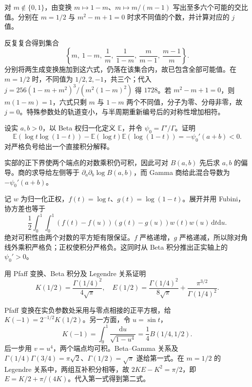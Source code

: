 \begin{exercise}\label{b3:ex:F-5}
对 \(m\notin\{0,1\}\)，由变换 \(m\mapsto1-m\)、\(m\mapsto m/(m-1)\) 写出至多六个可能的交比值。分别在 \(m=1/2\) 与 \(m^2-m+1=0\) 时求不同值的个数，并计算对应的 \(j\) 值。
\end{exercise}
\begin{solution}
反复复合得到集合
\[
 \left\{m,\ 1-m,\ \frac1m,\ \frac1{1-m},\
 \frac m{m-1},\ \frac{m-1}m\right\}.
\]
分别将两生成变换施加到这六式，仍落在该集合内，故已包含全部可能值。在 \(m=1/2\) 时，不同值为 \(1/2,2,-1\)，共三个；代入
\(j=256(1-m+m^2)^3/(m^2(1-m)^2)\) 得 \(1728\)。若 \(m^2-m+1=0\)，则 \(m(1-m)=1\)，六式只剩 \(m\) 与 \(1-m\) 两个不同值，分子为零、分母非零，故 \(j=0\)。特殊参数处的轨道变小，与半周期重新编号后的对称性增加相符。
\end{solution}

\begin{exercise}\label{b3:ex:F-6}
设实 \(a,b>0\)，以 Beta 权归一化定义 \(\mathbb E\)，并令 \(\psi_0=\Gamma'/\Gamma\)。证明
\[
 \mathbb E(\log t\log(1-t))
 -\mathbb E(\log t)\mathbb E(\log(1-t))=-\psi_0'(a+b)<0.
\]
对严格负号给出一个直接积分解释。
\end{exercise}
\begin{solution}
实部的正下界使两个端点的对数乘积仍可积，因此可对 \(B(a,b)\) 先后求 \(a,b\) 的偏导。商的求导给左侧等于 \(\partial_a\partial_b\log B(a,b)\)，而 Gamma 商给此混合导数为 \(-\psi_0'(a+b)\)。

记 \(w\) 为归一化正权，\(f(t)=\log t\)、\(g(t)=\log(1-t)\)。展开并用 Fubini，协方差也等于
\[
 \frac12\int_0^1\int_0^1
 (f(t)-f(u))(g(t)-g(u))w(t)w(u)\,\mathrm{d}t\mathrm{d}u.
\]
绝对可积性由两个对数的平方矩有限保证。\(f\) 严格递增，\(g\) 严格递减，所以除对角线外乘积严格负；正权使积分严格负。这同时从 Beta 积分推出正实轴上的 \(\psi_0'>0\)。
\end{solution}

\begin{exercise}\label{b3:ex:F-7}
用 Pfaff 变换、Beta 积分及 Legendre 关系证明
\[
 K(1/2)=\frac{\Gamma(1/4)^2}{4\sqrt\pi},
 \quad
 E(1/2)=\frac{\Gamma(1/4)^2}{8\sqrt\pi}
          +\frac{\pi^{3/2}}{\Gamma(1/4)^2}.
\]
\end{exercise}
\begin{solution}
Pfaff 变换在实负参数处采用与零点相接的正平方根，给 \(K(-1)=2^{-1/2}K(1/2)\)。另一方面，令 \(u=\sin t\)，
\[
 K(-1)=\int_0^1\frac{\mathrm{d}u}{\sqrt{1-u^4}}
       =\frac14 B(1/4,1/2).
\]
后一步用 \(v=u^4\)，两个端点均可积。Beta--Gamma 关系及
\(\Gamma(1/4)\Gamma(3/4)=\pi\sqrt2\)、\(\Gamma(1/2)=\sqrt\pi\) 遂给第一式。在 \(m=1/2\) 的 Legendre 关系中，两组互补积分相等，故 \(2KE-K^2=\pi/2\)，即 \(E=K/2+\pi/(4K)\)。代入第一式得到第二式。
\end{solution}

